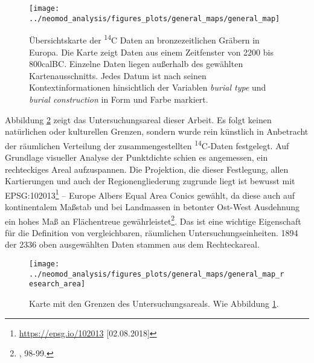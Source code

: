 \documentclass[openany,twoside,twocolumn]{book}
\let\rmarkdownfootnote\footnote%
\def\footnote{\protect\rmarkdownfootnote}
\begin{document}
\begin{figure}
\texttt{[image: ../neomod\_analysis/figures\_plots/general\_maps/general\_map]} \caption[Übersichtskarte der \textsuperscript{14}C Daten an bronzezeitlichen Gräbern in Europa]{Übersichtskarte der \textsuperscript{14}C Daten an bronzezeitlichen Gräbern in Europa. Die Karte zeigt Daten aus einem  Zeitfenster von 2200 bis 800calBC. Einzelne Daten liegen außerhalb des gewählten Kartenausschnitts. Jedes Datum ist nach seinen Kontextinformationen hinsichtlich der Variablen \textit{burial type} und \textit{burial construction} in Form und Farbe markiert.}\label{fig:general-map}
\end{figure}

Abbildung \ref{fig:general-map-research-area} zeigt das
Untersuchungsareal dieser Arbeit. Es folgt keinen natürlichen oder
kulturellen Grenzen, sondern wurde rein künstlich in Anbetracht der
räumlichen Verteilung der zusammengestellten \textsuperscript{14}C-Daten
festgelegt. Auf Grundlage visueller Analyse der Punktdichte schien es
angemessen, ein rechteckiges Areal aufzuspannen. Die Projektion, die
dieser Festlegung, allen Kartierungen und auch der Regionengliederung
zugrunde liegt ist bewusst mit EPSG:102013\footnote{\url{https://epsg.io/102013}
  {[}02.08.2018{]}} -- Europe Albers Equal Area Conics gewählt, da diese
auch auf kontinentalem Maßstab und bei Landmassen in betonter Ost-West
Ausdehnung ein hohes Maß an Flächentreue gewährleistet\footnote{\textcite{snyder_map_1987},
  98-99.}. Das ist eine wichtige Eigenschaft für die Definition von
vergleichbaren, räumlichen Untersuchungseinheiten. 1894 der 2336 oben
ausgewählten Daten stammen aus dem Rechteckareal.

\begin{figure}
\texttt{[image: ../neomod\_analysis/figures\_plots/general\_maps/general\_map\_research\_area]} \caption[Karte mit den Grenzen des Untersuchungsareals]{Karte mit den Grenzen des Untersuchungsareals. Wie Abbildung \ref{fig:general-map}.}\label{fig:general-map-research-area}
\end{figure}
\end{document}
